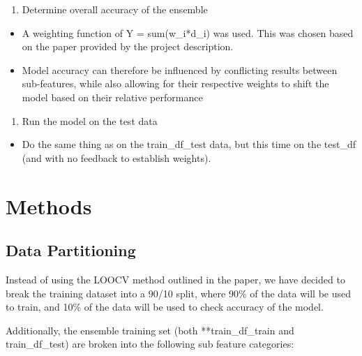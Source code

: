 \documentclass[
]{article}
\providecommand{\tightlist}{%
  \setlength{\itemsep}{0pt}\setlength{\parskip}{0pt}}
\begin{document}
\begin{enumerate}
\def\labelenumi{\arabic{enumi}.}
\setcounter{enumi}{4}
\tightlist
\item
  Determine overall accuracy of the ensemble
\end{enumerate}

\begin{itemize}
\tightlist
\item
  A weighting function of Y = sum(w\_i*d\_i) was used. This was chosen based on the paper provided by the project description.
\item
  Model accuracy can therefore be influenced by conflicting results between sub-features, while also allowing for their respective weights to shift the model based on their relative performance
\end{itemize}

\begin{enumerate}
\def\labelenumi{\arabic{enumi}.}
\setcounter{enumi}{5}
\tightlist
\item
  Run the model on the test data
\end{enumerate}

\begin{itemize}
\tightlist
\item
  Do the same thing as on the train\_df\_test data, but this time on the test\_df (and with no feedback to establish weights).
\end{itemize}

\hypertarget{methods}{%
\section{Methods}\label{methods}}

\hypertarget{data-partitioning}{%
\subsection{Data Partitioning}\label{data-partitioning}}

Instead of using the LOOCV method outlined in the paper, we have decided to break the training dataset into a 90/10 split, where 90\% of the data will be used to train, and 10\% of the data will be used to check accuracy of the model.

Additionally, the ensemble training set (both **train\_df\_train and train\_df\_test) are broken into the following sub feature categories:
\end{document}
